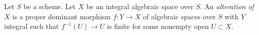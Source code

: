 \begin{definition}
\label{definition-alteration}
Let $S$ be a scheme. Let $X$ be an integral algebraic space over $S$.
An {\it alteration of $X$} is a proper dominant morphism $f : Y \to X$
of algebraic spaces over $S$ with $Y$ integral such that $f^{-1}(U) \to U$
is finite for some nonempty open $U \subset X$.
\end{definition}